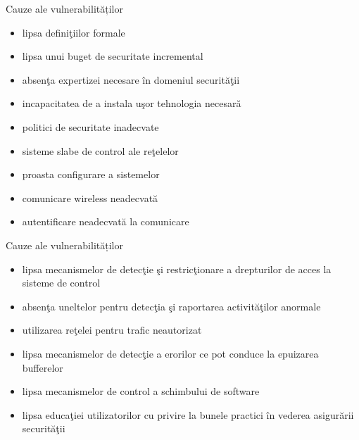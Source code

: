 \documentclass[pdf]{beamer}
\begin{document}
\begin{frame}{Cauze ale vulnerabilităților}
\begin{itemize}
\item
lipsa definiţiilor formale

\item
lipsa unui buget de securitate incremental

\item
absenţa expertizei necesare în domeniul securităţii

\item
incapacitatea de a instala uşor tehnologia necesară

\item
politici de securitate inadecvate

\item
sisteme slabe de control ale reţelelor

\item
proasta configurare a sistemelor

\item
comunicare wireless neadecvată

\item
autentificare neadecvată la comunicare

\end{itemize}
\end{frame}



\begin{frame}{Cauze ale vulnerabilităților}
\begin{itemize}
\item
lipsa mecanismelor de detecţie şi restricţionare a drepturilor de acces la sisteme de control

\item
absenţa uneltelor pentru detecţia şi raportarea activităţilor anormale

\item
utilizarea reţelei pentru trafic neautorizat

\item
lipsa mecanismelor de detecţie a erorilor ce pot conduce la epuizarea bufferelor

\item
lipsa mecanismelor de control a schimbului de software

\item
lipsa educaţiei utilizatorilor cu privire la bunele practici în vederea asigurării securităţii

\end{itemize}
\end{frame}
\end{document}
